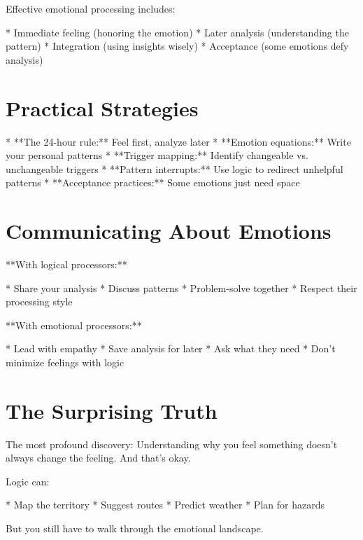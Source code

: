 \documentclass[12pt,oneside]{book}
\begin{document}
Effective emotional processing includes:

                    * Immediate feeling (honoring the emotion)
                    * Later analysis (understanding the pattern)
                    * Integration (using insights wisely)
                    * Acceptance (some emotions defy analysis)

\section{Practical Strategies}

                    * **The 24-hour rule:** Feel first, analyze later
                    * **Emotion equations:** Write your personal patterns
                    * **Trigger mapping:** Identify changeable vs. unchangeable triggers
                    * **Pattern interrupts:** Use logic to redirect unhelpful patterns
                    * **Acceptance practices:** Some emotions just need space

\section{Communicating About Emotions}

**With logical processors:**

                    * Share your analysis
                    * Discuss patterns
                    * Problem-solve together
                    * Respect their processing style

**With emotional processors:**

                    * Lead with empathy
                    * Save analysis for later
                    * Ask what they need
                    * Don't minimize feelings with logic

\section{The Surprising Truth}

The most profound discovery: Understanding why you feel something doesn't always change the feeling. And that's okay.

Logic can:

                    * Map the territory
                    * Suggest routes
                    * Predict weather
                    * Plan for hazards

But you still have to walk through the emotional landscape.
\end{document}
